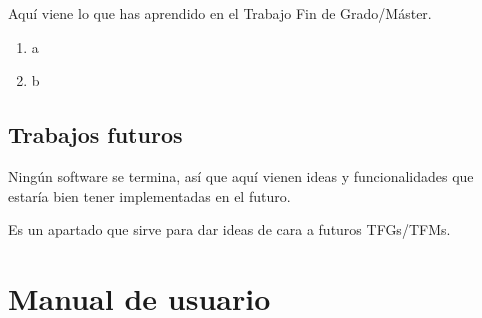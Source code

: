\documentclass[a4paper, 12pt, english]{book}
\begin{document}
Aquí viene lo que has aprendido en el Trabajo Fin de Grado/Máster.

\begin{enumerate}
  \item a
  \item b
\end{enumerate}


\section{Trabajos futuros}
\label{sec:trabajos_futuros}

Ningún software se termina, así que aquí vienen ideas y funcionalidades que estaría bien tener implementadas en el futuro.

Es un apartado que sirve para dar ideas de cara a futuros TFGs/TFMs.



\cleardoublepage
\appendix
\chapter{Manual de usuario}
\label{app:manual}



\cleardoublepage


\end{document}
